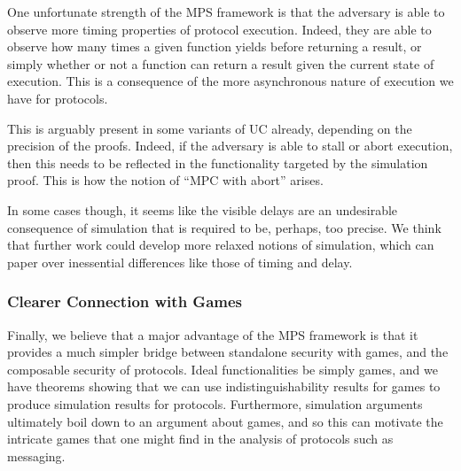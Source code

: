 One unfortunate strength of the MPS framework is that the adversary
is able to observe more timing properties of protocol execution.
Indeed, they are able to observe how many times a given function
yields before returning a result, or simply whether
or not a function can return a result given the current state of
execution.
This is a consequence of the more asynchronous nature
of execution we have for protocols.

This is arguably present in some variants of UC already,
depending on the precision of the proofs.
Indeed, if the adversary is able to stall or abort execution,
then this needs to be reflected in the functionality
targeted by the simulation proof.
This is how the notion of ``MPC with abort'' arises.

In some cases though, it seems like the visible
delays are an undesirable consequence of simulation that
is required to be, perhaps, too precise.
We think that further work could develop more relaxed notions of simulation,
which can paper over inessential differences like those of timing and delay.

\subsubsection*{Clearer Connection with Games}

Finally, we believe that a major advantage of the MPS framework is that
it provides a much simpler bridge between standalone security
with games, and the composable security of protocols.
Ideal functionalities be simply games,
and we have theorems showing that
we can use indistinguishability results for games to produce
simulation results for protocols.
Furthermore, simulation arguments ultimately boil down
to an argument about games, and so this can motivate the
intricate games that one might find in the analysis of protocols
such as messaging.
